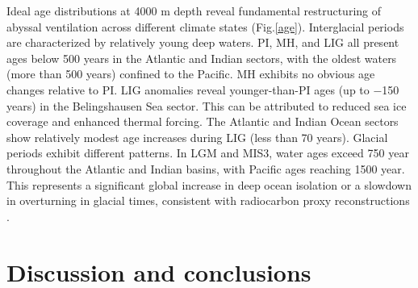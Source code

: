 \documentclass[pdflatex,sn-nature]{sn-jnl}
\begin{document}
Ideal age distributions at 4000 m depth reveal fundamental restructuring of abyssal ventilation across different climate states (Fig.\ref{age}). Interglacial periods are characterized by relatively young deep waters. PI, MH, and LIG all present ages below 500 years in the Atlantic and Indian sectors, with the oldest waters (more than 500 years) confined to the Pacific.  MH exhibits no obvious age changes relative to PI. LIG anomalies reveal younger-than-PI ages (up to $-$150 years) in the Belingshausen Sea sector. This can be attributed to reduced sea ice coverage and enhanced thermal forcing. The Atlantic and Indian Ocean sectors show relatively modest age increases during LIG (less than 70 years). Glacial periods exhibit different patterns. In LGM and MIS3, water ages exceed 750 year throughout the Atlantic and Indian basins, with Pacific ages reaching 1500 year. This represents a significant global increase in deep ocean isolation or a slowdown in overturning in glacial times, consistent with radiocarbon proxy reconstructions \cite{Skinner2017}.






\section{Discussion and conclusions}
\end{document}
